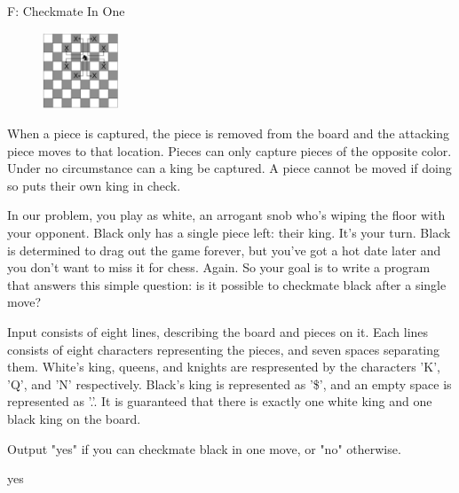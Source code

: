 \begin{problem}{F: Checkmate In One}
\begin{figure}[h]
    \centering
    \includegraphics[width=0.2\textwidth]{knight-moves.eps}
\end{figure}

When a piece is captured, the piece is removed from the board and the attacking piece moves to that location. Pieces can only capture pieces of the opposite color. Under no circumstance can a king be captured. A piece cannot be moved if doing so puts their own king in check.

In our problem, you play as white, an arrogant snob who's wiping the floor with your opponent. Black only has a single piece left: their king. It's your turn. Black is determined to drag out the game forever, but you've got a hot date later and you don't want to miss it for chess. Again. So your goal is to write a program that answers this simple question: is it possible to checkmate black after a single move?

\end{problem}

\begin{formalin}
Input consists of eight lines, describing the board and pieces on it. Each lines consists of eight characters representing the pieces, and seven spaces separating them. White's king, queens, and knights are respresented by the characters 'K', 'Q', and 'N' respectively. Black's king is represented as '\$', and an empty space is represented as '.'. It is guaranteed that there is exactly one white king and one black king on the board.
\end{formalin}

\begin{formalout}
Output "yes" if you can checkmate black in one move, or "no" otherwise.
\end{formalout}


\begin{dataout}
yes
\end{dataout}

